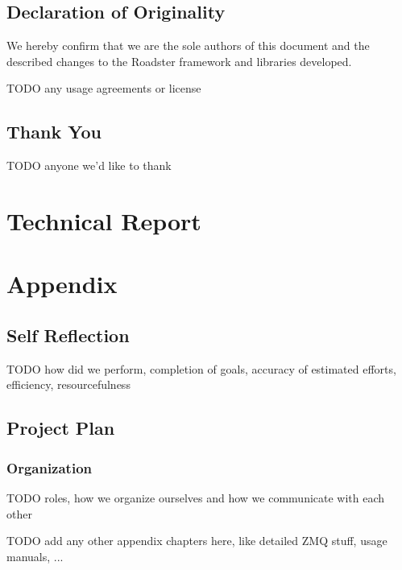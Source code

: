 \documentclass[a4paper]{report}
\begin{document}
\chapter*{Declaration of Originality}
We hereby confirm that we are the sole authors of this document and the
described changes to the Roadster framework and libraries developed.

TODO any usage agreements or license
%

\chapter*{Thank You}
TODO anyone we'd like to thank




\tableofcontents
\listoffigures
\listoftables
\lstlistoflistings

\pagebreak
{}
\setcounter{page}{1}
\part{Technical Report}







\printbibliography

\appendix
\part{Appendix}
\chapter{Self Reflection}
TODO how did we perform, completion of goals, accuracy of estimated efforts, efficiency, resourcefulness

\chapter{Project Plan}

\section{Organization}
TODO roles, how we organize ourselves and how we communicate with each other



TODO add any other appendix chapters here, like detailed ZMQ stuff, usage manuals, ...\\
\end{document}
